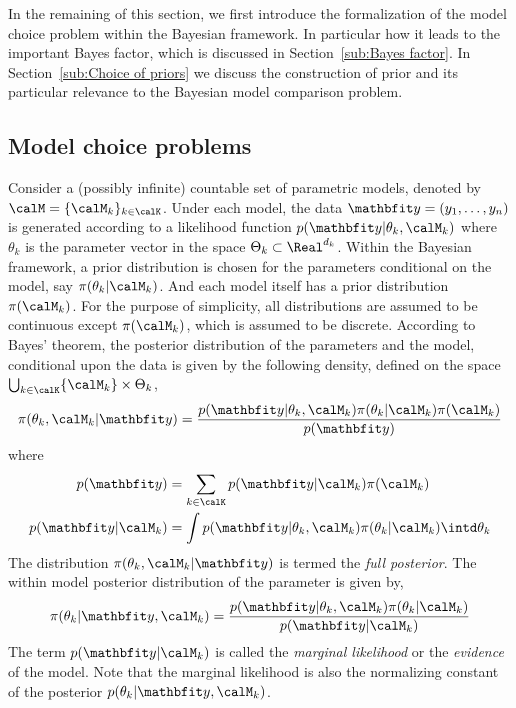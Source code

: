 In the remaining of this section, we first introduce the formalization of the
model choice problem within the Bayesian framework. In particular how it leads
to the important Bayes factor, which is discussed in Section~\ref{sub:Bayes
  factor}. In Section~\ref{sub:Choice of priors} we discuss the construction
of prior and its particular relevance to the Bayesian model comparison
problem.

\subsection{Model choice problems}
\label{sub:Model choice problems}

Consider a (possibly infinite) countable set of parametric models, denoted by
$\calM = \{\calM_k\}_{k\in\calK}$. Under each model, the data $\data =
(y_1,\dots,y_n)$ is generated according to a likelihood function
$p(\data|\theta_k,\calM_k)$ where $\theta_k$ is the parameter vector in the
space $\Theta_k\subset\Real^{d_k}$. Within the Bayesian framework, a prior
distribution is chosen for the parameters conditional on the model, say
$\pi(\theta_k|\calM_k)$. And each model itself has a prior distribution
$\pi(\calM_k)$. For the purpose of simplicity, all distributions are assumed
to be continuous except $\pi(\calM_k)$, which is assumed to be discrete.
According to Bayes' theorem, the posterior distribution of the parameters and
the model, conditional upon the data is given by the following density,
defined on the space $\bigcup_{k\in\calK}\{\calM_k\}\times\Theta_k$,
\begin{equation}
  \pi(\theta_k,\calM_k|\data) =
  \frac{p(\data|\theta_k,\calM_k)\pi(\theta_k|\calM_k)\pi(\calM_k)}{p(\data)}
  \label{eq:full posterior}
\end{equation}
where
\begin{align}
  p(\data) &= \sum_{k\in\calK}p(\data|\calM_k)\pi(\calM_k) \\
  p(\data|\calM_k) &=
  \int p(\data|\theta_k,\calM_k)\pi(\theta_k|\calM_k)\intd\theta_k
  \label{eq:marginal likelihood}
\end{align}
The distribution $\pi(\theta_k,\calM_k|\data)$ is termed the \emph{full
  posterior}. The within model posterior distribution of the parameter is
given by,
\begin{equation}
  \pi(\theta_k|\data,\calM_k) =
  \frac{p(\data|\theta_k,\calM_k)\pi(\theta_k|\calM_k)}{p(\data|\calM_k)}
  \label{eq:within posterior}
\end{equation}
The term $p(\data|\calM_k)$ is called the \emph{marginal likelihood} or the
\emph{evidence} of the model. Note that the marginal likelihood is also the
normalizing constant of the posterior $p(\theta_k|\data,\calM_k)$.

